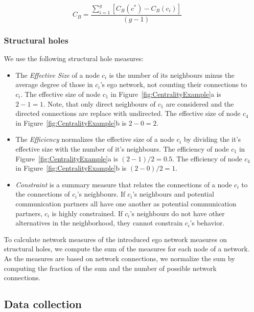 \documentclass[12pt,oneside]{book}
\begin{document}
\begin{equation}
\displaystyle C_B =  \frac{\sum_{i=1}^g[C_B(c^*)-C_B(c_i)]}{(g-1)}
\label{eq:GroupBetweenness}
\end{equation}


\subsubsection{Structural holes}
We use the following structural hole measures:
\begin{itemize}
  \item The \emph{Effective Size} of a node $c_i$ is the number of its
  neighbours minus the average degree of those in $c_i$'s ego network, not
  counting their connections to $c_i$. The effective size of node $c_1$ in 
  Figure~\ref{fig:CentralityExample}a is $2-1=1$. Note, that only direct
  neighbours of $c_1$ are considered and the directed connections are replace
  with undirected. The effective size of node $c_4$ in 
  Figure~\ref{fig:CentralityExample}b is $2-0=2$.
  
  \item The \emph{Efficiency} normalizes the effective size of a node $c_i$ by
  dividing the it's effective size with the number of it's neighbours. The
  efficiency of node $c_1$ in Figure~\ref{fig:CentralityExample}a is
  $(2-1)/2=0.5$. The efficiency of node $c_4$ in
  Figure~\ref{fig:CentralityExample}b is $(2-0)/2=1$.
  
  \item \emph{Constraint} is a summary measure that relates the connections of a
  node $c_i$ to the connections of $c_i$'s neighbours. If $c_i$'s neighbours and
  potential communication partners all have one another as potential communication
  partners, $c_i$ is highly constrained. If $c_i$'s neighbours do not have other
  alternatives in the neighborhood, they cannot constrain $c_i$'s behavior. 
\end{itemize}

To calculate network measures of the introduced ego network measures on
structural holes, we compute the sum of the measures for each node of a network.
As the measures are based on network connections, we normalize the sum by
computing the fraction of the sum and the number of possible network connections.

\subsection{Data collection} 
\end{document}
